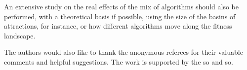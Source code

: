 An extensive study on the real effects of the mix of algorithms should
also be performed, with a theoretical basis if possible, using the
size of the basins of attractions, for instance, or how different
algorithms move along the fitness landscape.

\begin{acks}

  The authors would also like to thank the anonymous referees for
  their valuable comments and helpful suggestions. The work is
  supported by the so and so.
\end{acks}
